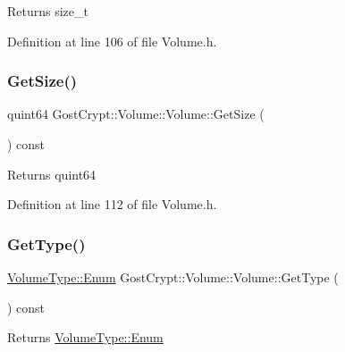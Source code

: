 \begin{DoxyReturn}{Returns}
size\+\_\+t 
\end{DoxyReturn}


Definition at line 106 of file Volume.\+h.

\mbox{\label{class_gost_crypt_1_1_volume_1_1_volume_a096bc6810b0667a970b85089cd824cc3}} 
\subsubsection{\texorpdfstring{Get\+Size()}{GetSize()}}
{\footnotesize\ttfamily quint64 Gost\+Crypt\+::\+Volume\+::\+Volume\+::\+Get\+Size (\begin{DoxyParamCaption}{ }\end{DoxyParamCaption}) const\hspace{0.3cm}{\ttfamily [inline]}}

\begin{DoxyReturn}{Returns}
quint64 
\end{DoxyReturn}


Definition at line 112 of file Volume.\+h.

\mbox{\label{class_gost_crypt_1_1_volume_1_1_volume_a39a73e8db2cc25661f3aff719bbb3b4c}} 
\subsubsection{\texorpdfstring{Get\+Type()}{GetType()}}
{\footnotesize\ttfamily \hyperlink{struct_gost_crypt_1_1_volume_1_1_volume_type_a7fe1979dab76d4534dcb1e26179d4717}{Volume\+Type\+::\+Enum} Gost\+Crypt\+::\+Volume\+::\+Volume\+::\+Get\+Type (\begin{DoxyParamCaption}{ }\end{DoxyParamCaption}) const\hspace{0.3cm}{\ttfamily [inline]}}

\begin{DoxyReturn}{Returns}
\hyperlink{struct_gost_crypt_1_1_volume_1_1_volume_type_a7fe1979dab76d4534dcb1e26179d4717}{Volume\+Type\+::\+Enum} 
\end{DoxyReturn}


